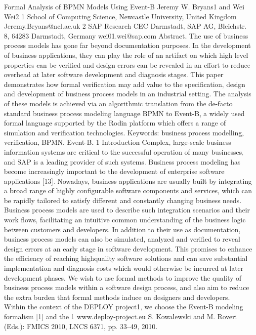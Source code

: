 Formal Analysis of BPMN Models Using
Event-B
Jeremy W. Bryans1 and Wei Wei2
1 School of Computing Science, Newcastle University, United Kingdom
Jeremy.Bryans@ncl.ac.uk 2 SAP Research CEC Darmstadt, SAP AG, Bleichstr. 8, 64283 Darmstadt, Germany
wei01.wei@sap.com
Abstract. The use of business process models has gone far beyond documentation purposes. In the development of business applications, they
can play the role of an artifact on which high level properties can be
verified and design errors can be revealed in an effort to reduce overhead
at later software development and diagnosis stages. This paper demonstrates how formal verification may add value to the specification, design and development of business process models in an industrial setting.
The analysis of these models is achieved via an algorithmic translation
from the de-facto standard business process modeling language BPMN
to Event-B, a widely used formal language supported by the Rodin platform which offers a range of simulation and verification technologies.
Keywords: business process modelling, verification, BPMN, Event-B.
1 Introduction
Complex, large-scale business information systems are critical to the successful
operation of many businesses, and SAP is a leading provider of such systems.
Business process modeling has become increasingly important to the development of enterprise software applications [13]. Nowadays, business applications
are usually built by integrating a broad range of highly configurable software
components and services, which can be rapidly tailored to satisfy different and
constantly changing business needs. Business process models are used to describe such integration scenarios and their work flows, facilitating an intuitive
common understanding of the business logic between customers and developers. In addition to their use as documentation, business process models can also
be simulated, analyzed and verified to reveal design errors at an early stage in
software development. This promises to enhance the efficiency of reaching highquality software solutions and can save substantial implementation and diagnosis
costs which would otherwise be incurred at later development phases.
We wish to use formal methods to improve the quality of business process
models within a software design process, and also aim to reduce the extra burden that formal methods induce on designers and developers. Within the context
of the DEPLOY project1, we choose the Event-B modeling formalism [1] and the
1 www.deploy-project.eu
S. Kowalewski and M. Roveri (Eds.): FMICS 2010, LNCS 6371, pp. 33–49, 2010.
